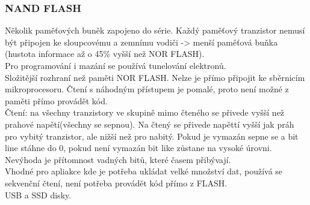 \subsubsection*{NAND FLASH}
Několik paměťových buněk zapojeno do série. Každý paměťový tranzistor nemusí být připojen ke sloupcovému
a zemnímu vodiči -> menší paměťová buňka (hustota informace
až o 45\% vyšší než NOR FLASH).\\
Pro programování i mazání se používá tunelování elektronů.\\
Složitější rozhraní než paměti NOR FLASH. Nelze je přímo připojit ke sběrnicím mikroprocesoru. Čtení s náhodným přístupem je pomalé, proto není možné z paměti přímo provádět kód. \\
Čtení: na všechny tranzistory ve skupině mimo čteného se přivede vyšší než prahové napětí(všechny se sepnou). Na čtený se přivede napěttí vyšší jak práh pro vybitý tranzistor, ale nižší než pro nabitý. Pokud je vymazán sepne se a bit line stáhne do 0, pokud není vymazán bit like zůstane na vysoké úrovni. \\
Nevýhoda je přítomnost vadných bitů, které časem přibývají.\\
Vhodné pro apliakce kde je potřeba ukládat velké množství dat, používá se sekvenční čtení, není potřeba provádět kód přímo z FLASH.\\
USB a SSD disky.\\

